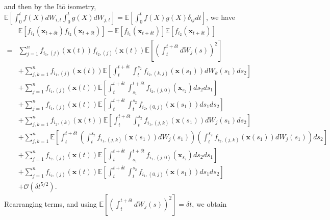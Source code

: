 %
and then by the It\={o} isometry, $\mathbb{E} \left[ \int_0^t f(X) dW_{i,t} \int_0^t g(X) dW_{j,t} \right] = \mathbb{E} \left[ \int_0^t f(X) g(X) \delta_{ij} dt \right]$, we have
\begin{equation}
\begin{aligned}
&\mathbb{E} \left[ f_{i_1}(\mathbf{x}_{t + \delta t}) f_{i_2}(\mathbf{x}_{t + \delta t}) \right] 
- \mathbb{E} \left[ f_{i_1}(\mathbf{x}_{t + \delta t}) \right] \mathbb{E} \left[ f_{i_2}(\mathbf{x}_{t + \delta t}) \right] \\
=& 
 \sum_{j=1}^n f_{{i_1},(j)}(\mathbf{x}(t)) f_{{i_2},(j)}(\mathbf{x}(t)) \mathbb{E} \left[ \left( \int_t^{t + \delta t} dW_j(s) \right)^2 \right] \\
&+ \sum_{j,k=1}^n f_{{i_1},(j)}(\mathbf{x}(t)) \mathbb{E} \left[  \int_t^{t+\delta t} \int_t^{s_2} f_{{i_2},(k,j)}(\mathbf{x}(s_1)) dW_k(s_1) ds_2 \right] \\
&+ \sum_{j=1}^n f_{{i_1},(j)}(\mathbf{x}(t)) \mathbb{E} \left[ \int_t^{t+\delta t} \int_{s_1}^{t+\delta t} f_{{i_2},(j,0)}(\mathbf{x}_{s_2}) ds_2 ds_1 \right]\\
&+ \sum_{j=1}^n f_{{i_1},(j)}(\mathbf{x}(t)) \mathbb{E} \left[  \int_t^{t+\delta t} \int_t^{s_2} f_{{i_2},(0,j)}(\mathbf{x}(s_1)) ds_1 ds_2\right] \\
&+  \sum_{j, k=1}^n  f_{{i_2},(k)}(\mathbf{x}(t))\mathbb{E} \left[ \int_t^{t+\delta t} \int_t^{s_2} f_{{i_1},(j,k)}(\mathbf{x}(s_1)) dW_j(s_1) ds_2 \right] \\
&+ \sum_{j, k=1}^n \mathbb{E} \left[ \int_t^{t+\delta t}\left( \int_t^{s_2} f_{{i_1},(j,k)}(\mathbf{x}(s_1)) dW_j(s_1)  \right) \left(  \int_t^{s_2} f_{{i_2},(j,k)}(\mathbf{x}(s_1)) dW_j(s_1) \right) ds_2 \right] \\
&+  \sum_{j=1}^n f_{{i_2},(j)}(\mathbf{x}(t)) \mathbb{E} \left[ \int_t^{t+\delta t} \int_{s_1}^{t + \delta t} f_{{i_1},(j,0)}(\mathbf{x}_{s_2}) ds_2 ds_1 \right]\\
&+   \sum_{j=1}^n  f_{{i_2},(j)}(\mathbf{x}(t)) \mathbb{E} \left[ \int_t^{t+\delta t} \int_t^{s_2} f_{{i_1},(0,j)}(\mathbf{x}(s_1)) ds_1 ds_2 \right] \\
&+ \mathcal{O} (\delta t^{5/2}) .
\end{aligned}
\end{equation}
%
Rearranging terms, and using $\mathbb{E} \left[ \left( \int_t^{t + \delta t} dW_j(s) \right)^2 \right] = \delta t$, we obtain
